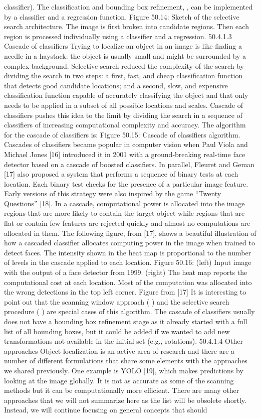 classifier). The classification and bounding box refinement, , can be implemented by a classifier and a regression function. Figure 50.14: Sketch of the selective search architecture. The image is first broken into candidate regions. Then each region is processed individually using a classifier and a regression. 50.4.1.3 Cascade of classifiers Trying to localize an object in an image is like finding a needle in a haystack: the object is usually small and might be surrounded by a complex background. Selective search reduced the complexity of the search by dividing the search in two steps: a first, fast, and cheap classification function that detects good candidate locations; and a second, slow, and expensive classification function capable of accurately classifying the object and that only needs to be applied in a subset of all possible locations and scales. Cascade of classifiers pushes this idea to the limit by dividing the search in a sequence of classifiers of increasing computational complexity and accuracy. The algorithm for the cascade of classifiers is: Figure 50.15: Cascade of classifiers algorithm. Cascades of classifiers became popular in computer vision when Paul Viola and Michael Jones [16] introduced it in 2001 with a ground-breaking real-time face detector based on a cascade of boosted classifiers. In parallel, Fleuret and Geman [17] also proposed a system that performs a sequence of binary tests at each location. Each binary test checks for the presence of a particular image feature. Early versions of this strategy were also inspired by the game “Twenty Questions” [18]. In a cascade, computational power is allocated into the image regions that are more likely to contain the target object while regions that are flat or contain few features are rejected quickly and almost no computations are allocated in them. The following figure, from [17], shows a beautiful illustration of how a cascaded classifier allocates computing power in the image when trained to detect faces. The intensity shown in the heat map is proportional to the number of levels in the cascade applied to each location. Figure 50.16: (left) Input image with the output of a face detector from 1999. (right) The heat map reports the computational cost at each location. Most of the computation was allocated into the wrong detections in the top left corner. Figure from [17] It is interesting to point out that the scanning window approach ( ) and the selective search procedure ( ) are special cases of this algorithm. The cascade of classifiers usually does not have a bounding box refinement stage as it already started with a full list of all bounding boxes, but it could be added if we wanted to add new transformations not available in the initial set (e.g., rotations). 50.4.1.4 Other approaches Object localization is an active area of research and there are a number of different formulations that share some elements with the approaches we shared previously. One example is YOLO [19], which makes predictions by looking at the image globally. It is not as accurate as some of the scanning methods but it can be computationally more efficient. There are many other approaches that we will not summarize here as the list will be obsolete shortly. Instead, we will continue focusing on general concepts that should 
